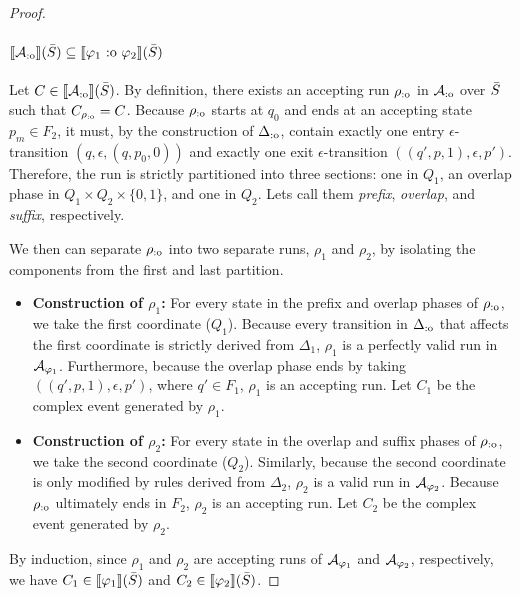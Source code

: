 \begin{proof}
\paragraph{$\sem{\cAoverlap}(\Stream) \subseteq \sem{\varphi_1 \overlap \varphi_2}(\Stream)$}
Let $C \in \sem{\cAoverlap}(\Stream)$. By definition, there exists an accepting run $\rho_{\text{:o}}$ in $\mathcal{A}_{\text{:o}}$ over $\bar{S}$ such that $C_{\rho_{\text{:o}}} = C$. 
Because $\rho_{\text{:o}}$ starts at $q_0$ and ends at an accepting state $p_m \in F_2$, it must, by the construction of $\Delta_{\text{:o}}$, contain exactly one entry $\epsilon$-transition $(q, \epsilon, (q, p_0, 0))$ and exactly one exit $\epsilon$-transition $((q', p, 1), \epsilon, p')$. Therefore, the run is strictly partitioned into three sections: one in $Q_1$, an overlap phase in $Q_1 \times Q_2 \times \{0,1\}$, and one in $Q_2$. Lets call them \emph{prefix}, \emph{overlap}, and \emph{suffix}, respectively.

We then can separate $\rho_{\text{:o}}$ into two separate runs, $\rho_1$ and $\rho_2$, by isolating the components from the first and last partition.
\begin{itemize}
	\item \textbf{Construction of $\rho_1$:} For every state in the prefix and overlap phases of $\rho_{\text{:o}}$, we take the first coordinate ($Q_1$). Because every transition in $\Delta_{\text{:o}}$ that affects the first coordinate is strictly derived from $\Delta_1$, $\rho_1$ is a perfectly valid run in $\mathcal{A}_{\varphi_1}$. Furthermore, because the overlap phase ends by taking $((q', p, 1), \epsilon, p')$, where $q' \in F_1$, $\rho_1$ is an accepting run. Let $C_1$ be the complex event generated by $\rho_1$.
	
	\item \textbf{Construction of $\rho_2$:} For every state in the overlap and suffix phases of $\rho_{\text{:o}}$, we take the second coordinate ($Q_2$). Similarly, because the second coordinate is only modified by rules derived from $\Delta_2$, $\rho_2$ is a valid run in $\mathcal{A}_{\varphi_2}$. Because $\rho_{\text{:o}}$ ultimately ends in $F_2$, $\rho_2$ is an accepting run. Let $C_2$ be the complex event generated by $\rho_2$.
\end{itemize}
By induction, since $\rho_1$ and $\rho_2$ are accepting runs of $\mathcal{A}_{\varphi_1}$ and $\mathcal{A}_{\varphi_2}$, respectively, we have $C_1 \in \sem{\varphi_1}(\Stream)$ and $C_2 \in \sem{\varphi_2}(\Stream)$. 


\end{proof}
